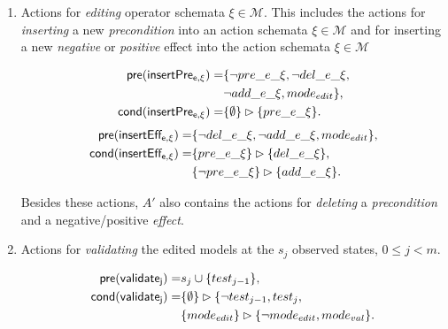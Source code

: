 \documentclass[letterpaper]{article} %
\newcommand{\pre}{\mathsf{pre}}     %
\newcommand{\cond}{\mathsf{cond}}   %
\begin{document}
\begin{itemize}
\begin{enumerate}
\item Actions for {\em editing} operator schemata $\xi\in\mathcal{M}$. This includes the actions for {\em inserting} a new {\em precondition} into an action schemata $\xi\in\mathcal{M}$ and for inserting a new {\em negative} or {\em positive} effect into the action schemata $\xi\in\mathcal{M}$
\begin{small}
\begin{align*}
\hspace*{7pt}\pre(\mathsf{insertPre_{e,\xi}})=&\{\neg pre\_e\_\xi, \neg del\_e\_\xi,\\
& \neg add\_e\_\xi, mode_{edit}\},\\
\cond(\mathsf{insertPre_{e,\xi}})=&\{\emptyset\}\rhd\{pre\_e\_\xi\}.
\end{align*}
\begin{align*}
\hspace*{7pt}\pre(\mathsf{insertEff_{e,\xi}})=&\{\neg del\_e\_\xi, \neg add\_e\_\xi,mode_{edit}\},\\
\cond(\mathsf{insertEff_{e,\xi}})=&\{pre\_e\_\xi\}\rhd\{del\_e\_\xi\},\\
&\{\neg pre\_e\_\xi\}\rhd\{add\_e\_\xi\}.
\end{align*}
\end{small}
Besides these actions, $A'$ also contains the actions for {\em deleting} a {\em precondition} and a negative/positive {\em effect}.

\item Actions for {\em validating} the edited models at the $s_j$ observed states, {\tt\small $0\leq j< m$}.
\begin{small}
\begin{align*}
\hspace*{7pt}\pre(\mathsf{validate_{j}})=&s_j\cup\{test_{j-1}\},\\
\cond(\mathsf{validate_{j}})=&\{\emptyset\}\rhd\{\neg test_{j-1}, test_j,\\
                            &\{mode_{edit}\}\rhd\{\neg mode_{edit}, mode_{val}\}.
\end{align*}
\end{small}
\end{enumerate}
\end{itemize}
\end{document}
